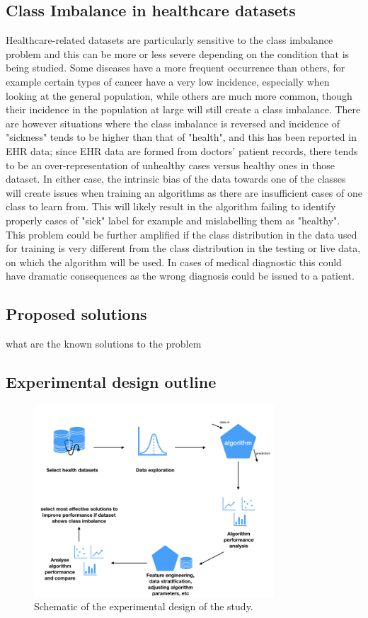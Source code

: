 \subsection{Class Imbalance in healthcare datasets}
Healthcare-related datasets are particularly sensitive to the class imbalance problem and this can be more or less severe depending on the condition that is being studied. Some diseases have a more frequent occurrence than others, for example certain types of cancer have a very low incidence, especially when looking at the general population, while others are much more common, though their incidence in the population at large will still create a class imbalance. There are however situations where the class imbalance is reversed and incidence of "sickness" tends to be higher than that of "health", and this has been reported in EHR data; since EHR data are formed from doctors' patient records, there tends to be an over-representation of unhealthy cases versus healthy ones in those dataset. In either case, the intrinsic bias of the data towards one of the classes will create issues when training an algorithms as there are insufficient cases of one class to learn from. This will likely result in the algorithm failing to identify properly cases of "sick" label for example and mislabelling them as "healthy". This problem could be further amplified if the class distribution in the data used for training is very different from the class distribution in the testing or live data, on which the algorithm will be used.
In cases of medical diagnostic this could have dramatic consequences as the wrong diagnosis could be issued to a patient. 

\subsection{Proposed solutions}

what are the known solutions to the problem
\subsection{Experimental design outline}


\begin{figure}[H]
    \centering
    \includegraphics[width=0.8\textwidth]{ThesisTemplate/usingLatex/images/Chapter3Figures001.jpeg}
    \caption{Schematic of the experimental design of the study.}
    \label{fig:my_label}
\end{figure}

